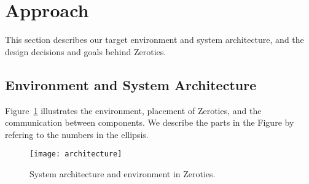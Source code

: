 \section{Approach}
\label{sec:approach}

This section describes our target environment and system architecture, and the design decisions and goals behind Zeroties.

\subsection{Environment and System Architecture}
\label{sub:architecture}

Figure~\ref{fig:architecture} illustrates the environment, placement of Zeroties, and the communication between components.
We describe the parts in the Figure by refering to the numbers in the ellipsis.

\begin{figure}[h]
    \centering
    \texttt{[image: architecture]}
    \caption{System architecture and environment in Zeroties.}
    \label{fig:architecture}
\end{figure}

